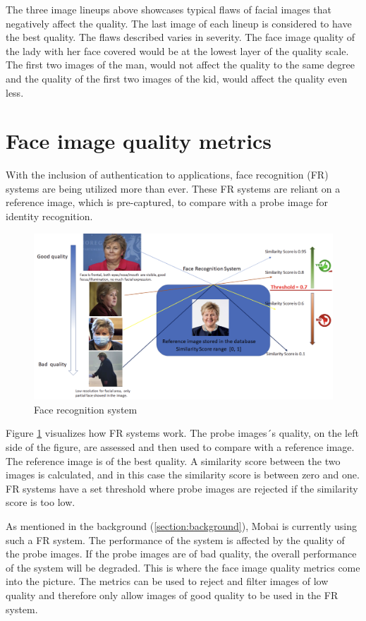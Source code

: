 The three image lineups above showcases typical flaws of facial images that negatively affect the quality. The last image of each lineup is considered to have the best quality. The flaws described varies in severity. The face image quality of the lady with her face covered would be at the lowest layer of the quality scale. The first two images of the man, would not affect the quality to the same degree and the quality of the first two images of the kid, would affect the quality even less. 
\newpage

\section{Face image quality metrics} 
With the inclusion of authentication to applications, face recognition (FR) systems are being utilized more than ever. These FR systems are reliant on a reference image, which is pre-captured, to compare with a probe image for identity recognition. 

\begin{figure}[h]
    \centering
    \includegraphics[scale = 0.45]{figures/Erna.png}
    \caption{Face recognition system}
    \label{fig:erna}
\end{figure}

Figure \ref{fig:erna} visualizes how FR systems work. The probe images´s quality, on the left side of the figure, are assessed and then used to compare with a reference image. The reference image is of the best quality. A similarity score between the two images is calculated, and in this case the similarity score is between zero and one. FR systems have a set threshold where probe images are rejected if the similarity score is too low. 

As mentioned in the background (\ref{section:background}), Mobai is currently using such a FR system. The performance of the system is affected by the quality of the probe images. If the probe images are of bad quality, the overall performance of the system will be degraded. This is where the face image quality metrics come into the picture. The metrics can be used to reject and filter images of low quality and therefore only allow images of good quality to be used in the FR system. 
\newpage

